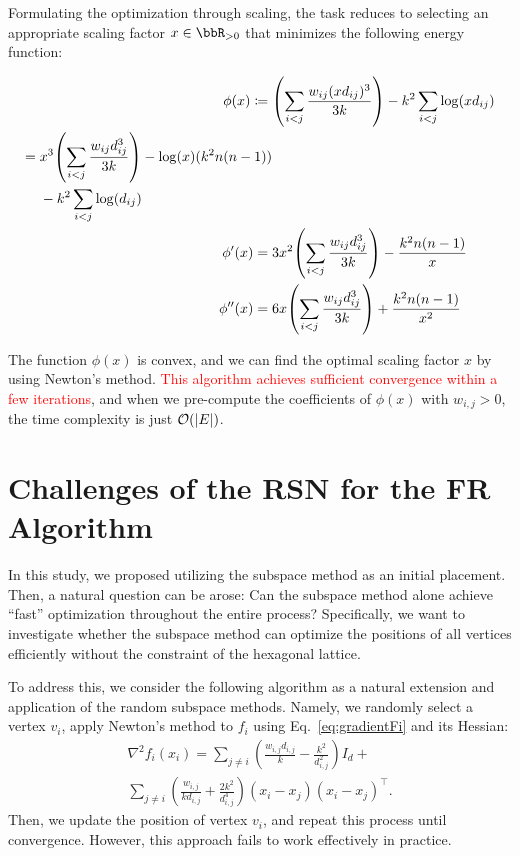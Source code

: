 \documentclass[dvipdfmx,journal]{IEEEtran}
\newcommand{\red}[1]{\textcolor{red}{#1}}
\newcommand{\defeq}{\coloneqq}
\begin{document}
Formulating the optimization through scaling, the task reduces to selecting an appropriate scaling factor $x \in \bbR_{> 0}$ that minimizes the following energy function:

\begin{align*}
  \phi(x) \defeq {} & \qty(\sum_{i < j} \frac{w_{ij} (xd_{ij})^3}{3k}) - k^2 \sum_{i < j} \log(x d_{ij})                                     \\
  \begin{split}
    = {} & x^3 \qty(\sum_{i < j} \frac{w_{ij} d_{ij}^3}{3k}) - \log(x)(k^2 n(n-1)) \\
         & - k^2 \sum_{i < j} \log(d_{ij})
  \end{split} \\
  \phi'(x) = {}     & 3x^2 \qty(\sum_{i < j} \frac{w_{ij} d_{ij}^3}{3k}) - \frac{k^2 n(n-1)}{x}                                              \\
  \phi''(x) = {}    & 6x \qty(\sum_{i < j} \frac{w_{ij} d_{ij}^3}{3k}) + \frac{k^2 n(n-1)}{x^2}
\end{align*}

The function $\phi(x)$ is convex, and we can find the optimal scaling factor $x$ by using Newton's method.
\red{This algorithm achieves sufficient convergence within a few iterations}, and when we pre-compute the coefficients of $\phi(x)$ with $w_{i,j} > 0$, the time complexity is just $\order{\abs{E}}$.

\section{Challenges of the RSN for the FR Algorithm}\label{sec:problemRSN}

In this study, we proposed utilizing the subspace method as an initial placement. Then, a natural question can be arose: Can the subspace method alone achieve ``fast'' optimization throughout the entire process?
Specifically, we want to investigate whether the subspace method can optimize the positions of all vertices efficiently without the constraint of the hexagonal lattice.

To address this, we consider the following algorithm as a natural extension and application of the random subspace methods. Namely, we randomly select a vertex $v_i$, apply Newton's method to $f_i$ using Eq.~\ref{eq:gradientFi} and its Hessian:
\begin{gather*}
  \nabla^2 f_i(x_i) = \sum_{j \neq i} \left(\frac{w_{i,j}d_{i,j}}{k} - \frac{k^2}{d_{i,j}^2}\right) I_d + \\
  \sum_{j \neq i} \left(\frac{w_{i,j}}{k d_{i,j}} + \frac{2k^2}{d_{i,j}^4}\right) (x_i - x_j)(x_i - x_j)^\top.
\end{gather*}
Then, we update the position of vertex $v_i$, and repeat this process until convergence.
However, this approach fails to work effectively in practice.
\end{document}
